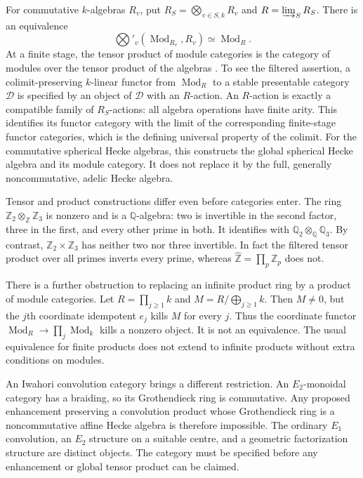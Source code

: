 For commutative $k$-algebras $R_v$, put
$R_S=\bigotimes_{v\in S,k}R_v$ and $R=\varinjlim_SR_S$.
There is an equivalence
\[
 \bigotimes'_v(\operatorname{Mod}_{R_v},R_v)
       \simeq\operatorname{Mod}_{R}.
\]
At a finite stage, the tensor product of module categories is the category
of modules over the tensor product of the algebras
\cite[Theorem~4.8.5.16]{syn-arith:HA}.
To see the filtered assertion, a colimit-preserving $k$-linear functor from
$\operatorname{Mod}_R$ to a stable presentable category $\mathcal D$ is
specified by an object of $\mathcal D$ with an $R$-action.
An $R$-action is exactly a compatible family of $R_S$-actions: all algebra
operations have finite arity.  This identifies its functor category with
the limit of the corresponding finite-stage functor categories, which is
the defining universal property of the colimit.
For the commutative spherical Hecke algebras, this constructs the global
spherical Hecke algebra and its module category.  It does not replace it
by the full, generally noncommutative, adelic Hecke algebra.

Tensor and product constructions differ even before categories enter.
The ring $\mathbb Z_2\otimes_{\mathbb Z}\mathbb Z_3$ is nonzero and is a
$\mathbb Q$-algebra: two is invertible in the second factor, three in the
first, and every other prime in both.  It identifies with
$\mathbb Q_2\otimes_{\mathbb Q}\mathbb Q_3$.
By contrast, $\mathbb Z_2\times\mathbb Z_3$ has neither two nor three invertible.
In fact the filtered tensor product over all primes inverts every prime,
whereas $\widehat{\mathbb Z}=\prod_p\mathbb Z_p$ does not.

There is a further obstruction to replacing an infinite product ring by a
product of module categories.  Let $R=\prod_{j\geq1}k$ and
$M=R/\bigoplus_{j\geq1}k$.  Then $M\ne0$, but the $j$th coordinate idempotent
$e_j$ kills $M$ for every $j$.  Thus the coordinate functor
$\operatorname{Mod}_R\to\prod_j\operatorname{Mod}_k$ kills a nonzero object.
It is not an equivalence.  The usual equivalence for finite products does
not extend to infinite products without extra conditions on modules.

An Iwahori convolution category brings a different restriction.
An $E_2$-monoidal category has a braiding, so its Grothendieck ring is
commutative.  Any proposed enhancement preserving a convolution product
whose Grothendieck ring is a noncommutative affine Hecke algebra is therefore
impossible.  The ordinary $E_1$ convolution, an $E_2$ structure on a suitable
centre, and a geometric factorization structure are distinct objects.
The category must be specified before any enhancement or global tensor
product can be claimed.

